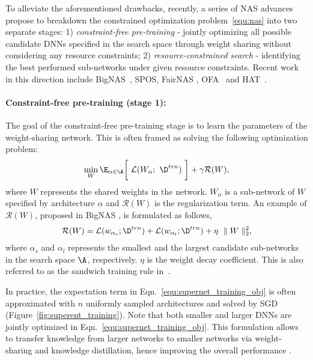 \documentclass[final]{cvpr}
\theoremstyle{definition}
\begin{document}
To alleviate the aforementioned drawbacks, 
recently, a series of NAS advances propose to breakdown the constrained optimization problem~\eqref{equ:nas} into two separate stages: 
1) \emph{constraint-free pre-training} - jointly optimizing all possible candidate DNNs specified in the search space through weight sharing  without considering any resource constraints;
2) \emph{resource-constrained search} - identifying the best performed sub-networks under given resource constraints. 
Recent work in this direction include BigNAS~\cite{yu2020bignas}, SPOS\cite{guo2020single}, FairNAS \cite{chu2019fairnas}, OFA~\cite{cai2019once} and HAT~\cite{wang2020hat}.

\paragraph{Constraint-free pre-training (stage 1):}
The goal of the constraint-free pre-training stage is to learn the parameters of the weight-sharing network. 
This is often framed as solving the following optimization problem: 
\begin{align}
\min_{W}\E_{\alpha \in \A} \bigg[~\L(W_\alpha; ~\D^{trn}) ~\bigg] + \gamma \mathcal{R}(W),
\label{equ:supernet_training_obj}
\end{align}
where $W$ represents the shared weights in the network. $W_\alpha$ is a sub-network of $W$ specified by architecture $\alpha$ and 
$\mathcal{R}(W)$ is the regularization term.
An example of $\mathcal{R}(W)$, proposed in BigNAS \cite{yu2020bignas}, is formulated as follows,
\begin{align}
\mathcal{R}(W) = \L(w_{\alpha_s}; \D^{trn}) + \L(w_{\alpha_l}; \D^{trn}) + \eta \ \parallel W \parallel_2^2, \label{equ:sandwich}
\end{align}
where $\alpha_s$ and $\alpha_l$ represents the smallest and the largest candidate sub-networks in the search space $\A$, respectively. $\eta$ is the weight decay coefficient. 
This is also referred to as the sandwich training rule in~\cite{yu2020bignas}. 

In practice, 
the expectation term in Eqn.~\eqref{equ:supernet_training_obj} is often approximated with $n$ uniformly sampled architectures and solved by SGD (Figure~\ref{fig:superent_training}). 
Note that both smaller and larger DNNs are jointly optimized in Eqn.~\eqref{equ:supernet_training_obj}. 
This formulation allows to transfer knowledge from larger networks to smaller networks via weight-sharing and knowledge distillation,
hence improving the overall performance \cite{yu2020bignas, cai2019once}.
\end{document}
